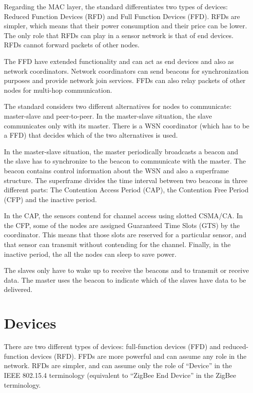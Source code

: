 Regarding the MAC layer, the standard differentiates two types of devices: Reduced Function Devices (RFD) and Full Function Devices (FFD).
RFDs are simpler, which means that their power consumption and their price can be lower.
The only role that RFDs can play in a sensor network is that of end devices.
RFDs cannot forward packets of other nodes.

The FFD have extended functionality and can act as end devices and also as network coordinators.
Network coordinators can send beacons for synchronization purposes and provide network join services.
FFDs can also relay packets of other nodes for multi-hop communication.

The standard considers two different alternatives for nodes to communicate: master-slave and peer-to-peer.
In the master-slave situation, the slave communicates only with its master.
There is a WSN coordinator (which has to be a FFD) that decides which of the two alternatives is used.

In the master-slave situation, the master periodically broadcasts a beacon and the slave has to synchronize to the beacon to communicate with the master.
The beacon contains control information about the WSN and also a superframe structure.
The superframe divides the time interval between two beacons in three different parts:
The Contention Access Period (CAP), the Contention Free Period (CFP) and the inactive period.

In the CAP, the sensors contend for channel access using slotted CSMA/CA. 
In the CFP, some of the nodes are assigned Guaranteed Time Slots (GTS) by the coordinator.
This means that those slots are reserved for a particular sensor, and that sensor can transmit without contending for the channel.
Finally, in the inactive period, the all the nodes can sleep to save power.

The slaves only have to wake up to receive the beacons and to transmit or receive data.
The master uses the beacon to indicate which of the slaves have data to be delivered.

\section{Devices}

There are two different types of devices: full-function devices (FFD) and reduced-function devices (RFD).
FFDs are more powerful and can assume any role in the network.
RFDs are simpler, and can assume only the role of ``Device'' in the IEEE 802.15.4 terminology (equivalent to ``ZigBee End Device'' in the ZigBee terminology.

